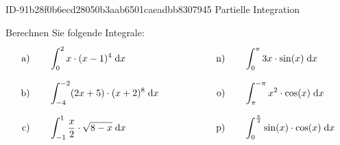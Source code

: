 \begin{exercise}
      {ID-91b28f0b6ecd28050b3aab6501caeadbb8307945}
      {Partielle Integration}
  \ifproblem\problem\par
    Berechnen Sie folgende Integrale:
    \begingroup
      \allowdisplaybreaks
      \newcommand{\da}{\;\mathrm{d}a}
      \newcommand{\dt}{\;\mathrm{d}t}
      \newcommand{\dx}{\;\mathrm{d}x}
      \newcommand{\separator}{\qquad&\qquad}%
      \newcommand{\vstrut}{\rule[-3.5ex]{0pt}{7.5ex}}%
      \newcommand{\exca}{&\int_{0}^{2}x\cdot(x-1)^{4}\dx}%
      \newcommand{\excb}{&\int_{-4}^{-2}(2x+5)\cdot(x+2)^{8}\dx}%
      \newcommand{\excc}{&\int_{-1}^{1}\frac{x}{2}\cdot\sqrt{8-x}\dx}%
      \newcommand{\excd}{&\int_{0}^{3}x\cdot\sqrt{2x+3}\dx}%
      \newcommand{\exce}{&\int_{0}^{2}x\cdot e^{x}\dx}%
      \newcommand{\excf}{&\int_{1}^{2}x\cdot e^{-x}\dx}%
      \newcommand{\excg}{&\int_{0}^{1}x^{2}\cdot e^{x}\dx}%
      \newcommand{\exch}{&\int_{0}^{1}x^{2}\cdot e^{-x}\dx}%
      \newcommand{\exci}{&\int_{-1}^{1}x\cdot e^{2x}\dx}%
      \newcommand{\excj}{&\int_{0}^{2}5x\cdot e^{x}\dx}%
      \newcommand{\exck}{&\int_{1}^{2}(3-x)\cdot e^{2-x}\dx}%
      \newcommand{\excl}{&\int_{0}^{1}\left(x^{2}-3x+4\right)\cdot e^{x}\dx}%
      \newcommand{\excm}{&\int_{-2}^{2}e^{x}\cdot\cos(x)\dx}%
      \newcommand{\excn}{&\int_{0}^{\pi}3x\cdot\sin(x)\dx}%
      \newcommand{\exco}{&\int_{\pi}^{-\pi}x^{2}\cdot\cos(x)\dx}%
      \newcommand{\excp}{&\int_{0}^{\frac{\pi}{2}}\sin(x)\cdot\cos(x)\dx}%
      \newcommand{\excq}{&\int_{0}^{\frac{\pi}{2}}\big(\sin(x)\big)^{2}\dx}%
      \newcommand{\excr}{&\int_{0}^{\pi}\sin(x)\cdot e^{x}\dx}%
      \newcommand{\excs}{&\int_{1}^{e}\ln(x)\dx}%
      \newcommand{\exct}{&\int_{e}^{e^{2}}x\cdot\ln(x)\dx}%
      \newcommand{\excu}{&\int_{1}^{e}x\cdot\ln(2x)\dx}%
      \newcommand{\excv}{&\int_{1}^{e^{2}}x^{2}\cdot\ln(x)\dx}%
      \newcommand{\excw}{&\int_{1}^{3}(\ln(x))^{2}\dx}%
      \newcommand{\excx}{&\int_{1}^{2}\frac{\ln(x)}{x}\dx}%
      \newcommand{\excy}{&\int_{1}^{e}\frac{\ln(x)}{e^{x}}\dx}%
      \newcommand{\excz}{&\int_{\pi}^{2\pi}\sin(x)\cdot\cos(x)\cdot\ln(x)\dx}%
      \begin{alignat*}{5}
        \text{a)\vstrut}&\quad & \exca & \separator & \text{n)\vstrut}&\quad & \excn \\
        \text{b)\vstrut}&\quad & \excb & \separator & \text{o)\vstrut}&\quad & \exco \\
        \text{c)\vstrut}&\quad & \excc & \separator & \text{p)\vstrut}&\quad & \excp \\

\end{alignat*}
\end{exercise}
